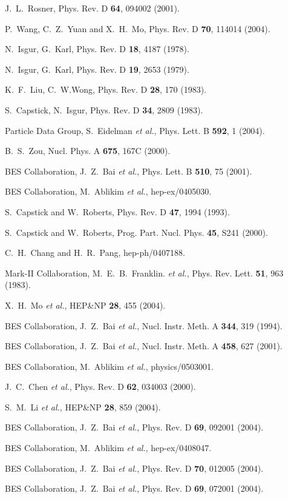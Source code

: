 \documentclass[prd,twocolumn,showpacs,amsmath,amssymb]{revtex4}
\begin{document}
\begin{thebibliography}{99}

 J.~L.~Rosner, Phys. Rev. D {\bf 64}, 094002 (2001).

 P.~Wang, C.~Z.~Yuan and X.~H.~Mo, Phys. Rev. D
{\bf 70}, 114014 (2004).

 N.~Isgur, G.~Karl, Phys. Rev. D {\bf 18}, 4187 (1978).

 N.~Isgur, G.~Karl, Phys. Rev. D {\bf 19}, 2653 (1979).

 K.~F.~Liu, C.~W.Wong, Phys. Rev. D {\bf 28}, 170 (1983).

 S.~Capstick, N.~Isgur, Phys. Rev. D {\bf 34}, 2809 (1983).

 Particle Data Group, S.~Eidelman {\em et al.},
              Phys. Lett. B {\bf 592}, 1 (2004).

 B.~S.~Zou, Nucl. Phys. A {\bf 675}, 167C (2000).

 BES Collaboration, J.~Z.~Bai {\em et al.},
             Phys. Lett. B {\bf 510}, 75 (2001).

 BES Collaboration, M.~Ablikim {\em et al.}, hep-ex/0405030.

 S.~Capstick and W.~Roberts, Phys. Rev. D {\bf 47}, 1994 (1993).

 S.~Capstick and W.~Roberts, Prog. Part. Nucl. Phys.
                 {\bf 45}, S241 (2000).

 C.~H.~Chang and H.~R.~Pang, hep-ph/0407188.

 Mark-II Collaboration, M.~E.~B.~Franklin. {\em et al.},
           Phys. Rev. Lett. {\bf 51}, 963 (1983).

 X.~H.~Mo {\em et al.}, HEP\&NP {\bf 28}, 455 (2004).

 BES Collaboration, J.~Z.~Bai {\em et al.}, Nucl. Instr. Meth.
              A {\bf 344}, 319 (1994).

 BES Collaboration, J.~Z.~Bai {\em et al.}, Nucl. Instr. Meth.
              A {\bf 458}, 627 (2001).

 BES Collaboration, M.~Ablikim {\em et al.},
                physics/0503001.

 J.~C.~Chen {\em et al.}, Phys. Rev. D
                    {\bf 62}, 034003 (2000).

 S.~M.~Li {\em et al.}, HEP\&NP {\bf 28}, 859 (2004).

 BES Collaboration, J.~Z.~Bai {\em et al.},
                    Phys. Rev. D {\bf 69}, 092001 (2004).

 BES Collaboration, M.~Ablikim {\em et al.},
                hep-ex/0408047.

 BES Collaboration, J.~Z.~Bai {\em et al.},
                    Phys. Rev. D {\bf 70}, 012005 (2004).

 BES Collaboration, J.~Z.~Bai {\em et al.},
                    Phys. Rev. D {\bf 69}, 072001 (2004).

\end{thebibliography}
\end{document}
